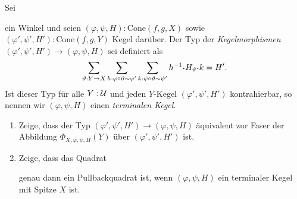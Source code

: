 \documentclass{uebung}
\begin{document}
\begin{exercise}
  Sei
  ein Winkel und seien $(\varphi,\psi,H):\mathrm{Cone}(f,g,X)$ sowie $(\varphi',\psi',H'):\mathrm{Cone}(f,g,Y)$ Kegel darüber.
  Der Typ der \emph{Kegelmorphismen} $(\varphi',\psi',H')\to (\varphi,\psi,H)$ sei definiert als
  $$
  \sum_{\vartheta:Y \to X}
  \sum_{h:\varphi\circ\vartheta\sim\varphi'}
  \sum_{k:\psi\circ\vartheta\sim\psi'}
  h^{-1} \kon H_\vartheta \kon k = H'.
  $$
  Ist dieser Typ für alle $Y:\mathcal{U}$ und jeden $Y$-Kegel $(\varphi',\psi',H')$ kontrahierbar, so nennen wir $(\varphi,\psi,H)$ einen \emph{terminalen Kegel}.
  \begin{enumerate}
    \item Zeige, dass der Typ $(\varphi',\psi',H')\to (\varphi,\psi,H)$ äquivalent zur Faser der Abbildung $\Phi_{X,\varphi,\psi,H}(Y)$ über $(\varphi',\psi',H')$ ist.
    \item Zeige, dass das Quadrat
      \begin{center}
      \end{center}
      genau dann ein Pullbackquadrat ist, wenn $(\varphi,\psi,H)$ ein terminaler Kegel mit Spitze $X$ ist.
  \end{enumerate}
\end{exercise}

\begin{exercise}
\end{exercise}
\end{document}
